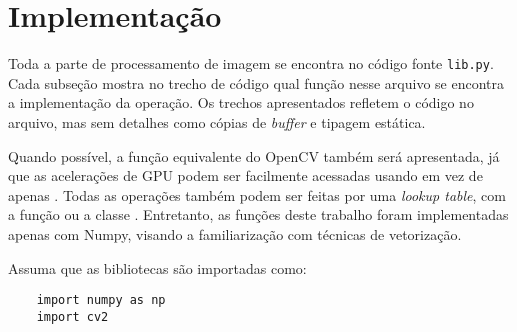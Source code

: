 \section{Implementação}

Toda a parte de processamento de imagem se encontra no código fonte \texttt{lib.py}. Cada subseção mostra no trecho de código qual função nesse arquivo se encontra a implementação da operação. Os trechos apresentados refletem o código no arquivo, mas sem detalhes como cópias de \textit{buffer} e tipagem estática.

Quando possível, a função equivalente do OpenCV também será apresentada, já que as acelerações de GPU podem ser facilmente acessadas usando  em vez de apenas  \autocite{ref:cvcuda}. Todas as operações também podem ser feitas por uma \textit{lookup table}, com a função  \autocite{ref:LUT} ou a classe  \autocite{ref:cudaLUT}. Entretanto, as funções deste trabalho foram implementadas apenas com Numpy, visando a familiarização com técnicas de vetorização.

Assuma que as bibliotecas são importadas como:

\begin{verbatim}
    import numpy as np
    import cv2
\end{verbatim}











